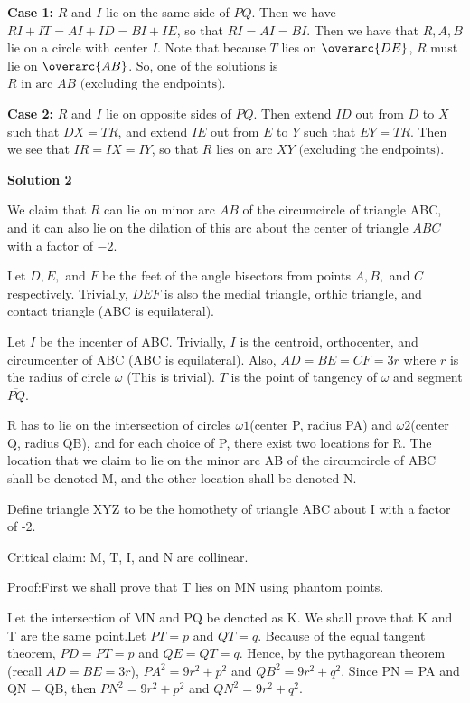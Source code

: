\begin{enumerate}
 \textbf{Case 1:} $R$ and $I$ lie on the same side of $PQ$. Then we have $RI+IT=AI+ID=BI+IE$, so that $RI=AI=BI$. Then we have that $R, A, B$ lie on a circle with center $I$. Note that because $T$ lies on $\overarc{DE}$, $R$ must lie on $\overarc{AB}$. So, one of the solutions is $\boxed{R \text{ in arc } AB\text{ (excluding the endpoints)}}$.

 \textbf{Case 2:} $R$ and $I$ lie on opposite sides of $PQ$. Then extend $ID$ out from $D$ to $X$ such that $DX=TR$, and extend $IE$ out from $E$ to $Y$ such that $EY=TR$. Then we see that $IR=IX=IY$, so that $\boxed{R \text{ lies on arc } XY\text{ (excluding the endpoints)}}$. 

 



\textbf{Solution 2}

We claim that $R$ can lie on minor arc $AB$ of the circumcircle of triangle ABC, and it can also lie on the dilation of this arc about the center of triangle $ABC$ with a factor of $-2.$

 
Let $D, E,$ and $F$ be the feet of the angle bisectors from points $A, B,$ and $C$ respectively. Trivially, $DEF$ is also the medial triangle, orthic triangle, and contact triangle (ABC is equilateral).

 
Let $I$ be the incenter of ABC. Trivially, $I$ is the centroid, orthocenter, and circumcenter of ABC (ABC is equilateral). Also, $AD=BE=CF=3r$ where $r$ is the radius of circle $\omega$ (This is trivial). $T$ is the point of tangency of $\omega$ and segment $\overline{PQ}$. 

 
R has to lie on the intersection of circles $\omega1$(center P, radius PA) and $\omega2$(center Q, radius QB), and for each choice of P, there exist two locations for R. The location that we claim to lie on the minor arc AB of the circumcircle of ABC shall be denoted M, and the other location shall be denoted N. 

 
Define triangle XYZ to be the homothety of triangle ABC about I with a factor of -2.

 
Critical claim: M, T, I, and N are collinear.

 
Proof:First we shall prove that T lies on MN using phantom points.

 
Let the intersection of MN and PQ be denoted as K. We shall prove that K and T are the same point.Let $PT = p$ and $QT = q$. Because of the equal tangent theorem, $PD=PT=p$ and $QE=QT=q$. Hence, by the pythagorean theorem (recall $AD=BE=3r$), $PA^2 = 9r^2 + p^2$ and $QB^2 = 9r^2 + q^2$. Since PN = PA and QN = QB, then $PN^2 = 9r^2 + p^2$ and $QN^2 = 9r^2 + q^2$. 


\end{enumerate}
